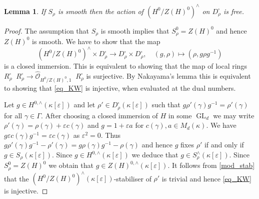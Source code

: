 \documentclass{amsart}
\newtheorem{lem}[prop]{Lemma}
\theoremstyle{definition}
\theoremstyle{remark}
\DeclareMathOperator{\GL}{GL}
\newcommand{\OO}{\mathcal O}
\DeclareMathOperator{\wtimes}{\widehat{\otimes}}
\begin{document}
\begin{lem}\label{KW} If $S_{\rho}$ is smooth then the action of $(H^0/Z(H)^0)^{\wedge}$ on $D^{\square}_{\rho}$ is free. 
\end{lem}
\begin{proof} The assumption that $S_{\rho}$ is smooth implies that $S^0_{\rho}=Z(H)^0$ and hence $Z(H)^0$ is smooth. We have to show that the map 
\begin{equation}\label{eq_KW}
(H^0/Z(H)^0)^{\wedge}\times D^{\square}_{\rho} \rightarrow D^{\square}_{\rho} \times D^{\square}_{\rho},\quad  (g, \rho)\mapsto (\rho, g \rho g^{-1})
\end{equation}is a closed immersion. This is equivalent to showing that the map of local 
rings $R^{\square}_{\rho}\wtimes
R^{\square}_{\rho}\rightarrow
\widehat{\OO}_{H^0/Z(H)^0,1}\wtimes R^{\square}_{\rho}$
is surjective. By Nakayama's lemma this is equivalent to
showing that \eqref{eq_KW} is injective, when evaluated
at the dual numbers. 

Let $g\in H^{0,
\wedge}(\kappa[\varepsilon])$ and let $\rho'\in 
D^{\square}_{\rho}(\kappa[\varepsilon])$ such that $g \rho'(\gamma) g^{-1}=\rho'(\gamma)$ for all $\gamma\in \Gamma$. After choosing a closed immersion of $H$ in some $\GL_d$ 
we may write $\rho'(\gamma)= \rho(\gamma)+ \varepsilon c(\gamma)$
and $g=1 + \varepsilon a$ 
for $c(\gamma), a\in M_d(\kappa)$. We have $g \varepsilon c(\gamma) g^{-1}= \varepsilon c(\gamma)$ as 
$\varepsilon^2=0$. Thus $g \rho'(\gamma) g^{-1} -\rho'(\gamma)= g \rho(\gamma) g^{-1} -\rho(\gamma)$ and hence $g$ fixes $\rho'$ if and only if $g\in S_{\rho}(\kappa[\varepsilon])$. 
Since $g\in H^{0, \wedge}(\kappa[\varepsilon])$ we deduce 
that $g\in S^{\wedge}_\rho(\kappa[\varepsilon])$. 
Since $S^0_{\rho}=Z(H)^0$ we obtain that 
$g\in Z(H)^{0, \wedge}(\kappa[\varepsilon])$. 
It follows from \eqref{mod_stab}  that the
$(H^0/Z(H)^0)^{\wedge}(\kappa[\varepsilon])$-stabiliser of $\rho'$ is trivial and hence  \eqref{eq_KW} is injective.
\end{proof}
 
\end{document}
